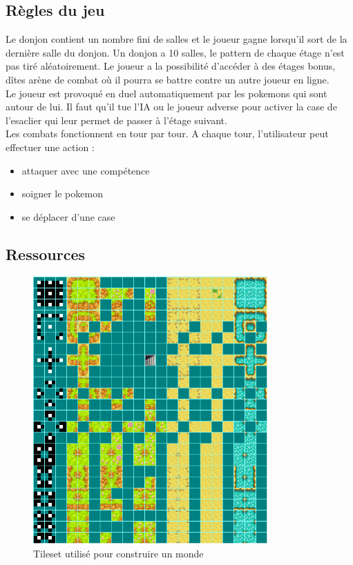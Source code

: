\documentclass[a4paper,12pt]{article}
\begin{document}
    \subsection{Règles du jeu}
	  Le donjon contient un nombre fini de salles et le joueur gagne lorsqu'il sort de la dernière salle du donjon.
	  Un donjon a 10 salles, le pattern de chaque étage n'est pas tiré aléatoirement. Le joueur a la possibilité d'accéder à des étages bonus, dîtes arène de combat où il pourra se battre contre un autre joueur en ligne.
	   \\Le joueur est provoqué en duel automatiquement par les pokemons qui sont autour de lui. Il faut qu'il tue l'IA ou le joueur adverse pour activer la case de l'esaclier qui leur permet de passer à l'étage suivant.
\\Les combats fonctionnent en tour par tour. A chaque tour, l'utilisateur peut effectuer une action :
\begin{itemize}
    \item attaquer avec une compétence
    \item soigner le pokemon
    \item se déplacer d'une case
\end{itemize}
\clearpage
    \subsection{Ressources}
    \begin{figure}[ht]
    \begin{center}
        \includegraphics[width=0.8\textwidth]{tilemap.png}
    \end{center}
    \caption{Tileset utilisé pour construire un monde}
    \end{figure}
    
\end{document}
